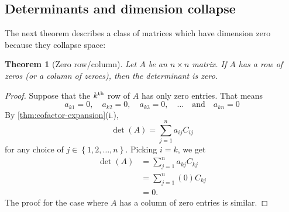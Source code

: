 \documentclass[10pt]{article}
\newtheorem{theorem}{Theorem}
\theoremstyle{definition}
\begin{document}
\subsection{Determinants and dimension collapse}
The next theorem describes a class of matrices which have dimension zero
because they collapse space:

\begin{theorem}[Zero row/column]
  \label{thm:zero-rowcolumn}
  Let $A$ be an $n\times n$ matrix. If $A$ has a row of zeros (or a column of
  zeroes), then the determinant is zero.
\end{theorem}


\begin{proof}
  Suppose that the $k^{\rm th}$ row of $A$ has only zero entries. That means
  \begin{equation*}
    a_{k1}=0,\quad a_{k2}=0, \quad a_{k3}=0,\quad\ldots \quad \text{and} \quad a_{kn}=0
  \end{equation*}
  By \cref{thm:cofactor-expansion}(i.),
  \begin{equation*}
    \det(A) = \sum_{j=1}^{n}a_{ij}C_{ij} 
  \end{equation*}
  for any choice of $j\in \left\{1,2,\ldots,n\right\}$. Picking $i=k$, we get
  \begin{align*}
    \det(A) 
    &= \sum_{j=1}^{n}a_{kj}C_{kj}\\
    &= \sum_{j=1}^{n}(0)C_{kj}\\
    &=0.
  \end{align*}
  The proof for the case where $A$ has a column of zero entries is similar.
\end{proof}
\end{document}
